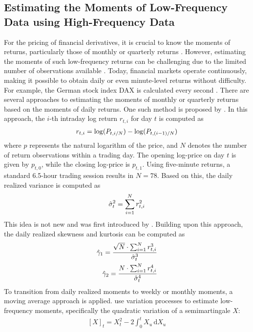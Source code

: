 \subsection{Estimating the Moments of Low-Frequency Data using High-Frequency Data}
For the pricing of financial derivatives, it is crucial to know the moments of returns, particularly those of monthly or quarterly returns \cite{barroRareDisastersAsset2006}. However, estimating the moments of such low-frequency returns can be challenging due to the limited number of observations available \cite{neubergerSkewnessStockMarket2021}. Today, financial markets operate continuously, making it possible to obtain daily or even minute-level returns without difficulty. For example, the German stock index DAX is calculated every second \cite{boersefrankfurtFunktioniertBoerse}. There are several approaches to estimating the moments of monthly or quarterly returns based on the moments of daily returns. One such method is proposed by \cite{amayaDoesRealizedSkewness2015}. In this approach, the $i$-th intraday log return $r_{t,i}$ for day $t$ is computed as
\begin{align}
    r_{t,i} = \log(P_{t,i/N}) - \log(P_{t,(i-1)/N})\notag
\end{align}
where $p$ represents the natural logarithm of the price, and $N$ denotes the number of return observations within a trading day. The opening log-price on day $t$ is given by $p_{t,0}$, while the closing log-price is $p_{t,1}$. Using five-minute returns, a standard 6.5-hour trading session results in $N = 78$. Based on this, the daily realized variance is computed as
\begin{align}
    \hat{\sigma}^2_t = \sum_{i=1}^{N}r_{t,i}^2\notag
\end{align}
This idea is not new and was first introduced by \cite{andersenAnsweringSkepticsYes1998}. Building upon this approach, the daily realized skewness and kurtosis can be computed as
\begin{align}
    \hat{\gamma}_1 = \frac{\sqrt{N}\cdot \sum_{i=1}^{N}r_{t,i}^3}{\hat{\sigma}_t^3}\notag\\
    \hat{\gamma}_2 = \frac{N\cdot \sum_{i=1}^{N}r_{t,i}^4}{\hat{\sigma}_t^4}\notag
\end{align}
To transition from daily realized moments to weekly or monthly moments, a moving average approach is applied. \cite{choeHighMomentVariations2014} use variation processes to estimate low-frequency moments, specifically the quadratic variation of a semimartingale $X$:
\begin{align}
    \label{eq:quadratic_variation}
    [X]_t = X_t^2 - 2\int_0^tX_u\,\mathrm{d}X_u
\end{align}
